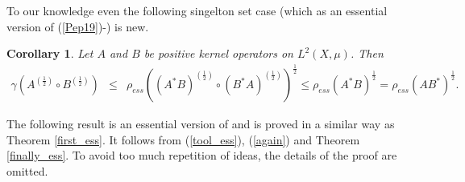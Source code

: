 \documentclass[12pt, reqno]{amsart}
\newtheorem{corollary}[theorem]{Corollary}
\theoremstyle{definition}
\theoremstyle{remark}
\numberwithin{equation}{section}
\begin{document}
To our  knowledge even the following singelton set case (which as an essential version of (\ref{Pep19})-\cite[Theorem 4.4, (4.8)]{P17+}) is new. 
\begin{corollary} Let $A$ and $B$ be positive kernel operators on $L^2(X, \mu)$. Then
\begin{eqnarray}
\nonumber
\gamma (A^{(\frac{1}{2})} \circ  B^{(\frac{1}{2})} ) &\le&\rho _{ess}  \left ( (A^* B) ^{(\frac{1}{2})}\circ (B^* A)^{(\frac{1}{2})}\right)^{\frac{1}{2}} \le \rho _{ess}  (A^* B ) ^{\frac{1}{2}}=
\rho _{ess}  \left (A B^* \right)^{\frac{1}{2}} . %
\end{eqnarray}
\label{ess_star}
\end{corollary}
The following result is an essential version of \cite[Theorem 3.3]{B23+} and is proved in a similar way as Theorem \ref{first_ess}. It follows from  (\ref{tool_ess}), (\ref{again}) and Theorem \ref{finally_ess}. To avoid too much repetition of ideas, the details of the proof are omitted.
\end{document}
